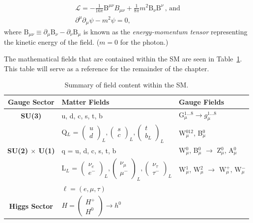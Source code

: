 \begin{equation}
\begin{array}{l}
\mathcal{L} = -\frac{1}{16\pi} \mathrm{B}^{\mu\nu}B_{\mu\nu} + \frac{1}{8\pi}m^{2}\mathrm{B}_{\nu}\mathrm{B}^{\nu}\,,\,\textrm{and}\\
\partial^{\mu} \partial_{\mu} \psi - m^{2} \psi = 0,
\end{array}
\end{equation}
where $\mathrm{B}_{\mu\nu} \equiv \partial_{\mu}\mathrm{B}_{\nu} - \partial_{\nu}\mathrm{B}_{\mu}$ is known as the \textit{energy-momentum tensor} representing the kinetic energy of the field. ($m=0$ for the photon.)

The mathematical fields that are contained within the SM are seen in Table~\ref{tab:sm}. This table will serve as a reference for the remainder of the chapter.

\begin{table}
\caption{Summary of field content within the SM.}
\centering
\begin{tabular}{c|ll}
\hline\hline
Gauge Sector & Matter Fields & Gauge Fields \\
\hline
\textbf{SU(3)} & u, d, c, s, t, b & G$_{\mu}^{1...8} \rightarrow g_{\mu}^{1...8} $ \\
\hline
 & Q$_{L}$ = $\begin{pmatrix} u \\ d \end{pmatrix}_{L}, \begin{pmatrix} s \\ c \end{pmatrix}_{L}, \begin{pmatrix} t \\ b_{L} \end{pmatrix}_{L} $ & W$^{012}_{\mu}$, B$^{0}_{\mu}$ \\
\textbf{SU(2) $\times$ U(1)} & q = u, d, c, s, t, b & W$_{\mu}^{0}$, B$_{\mu}^{0}$ $\rightarrow$ Z$^{0}_{\mu}$, A$^{0}_{\mu}$\\
  & L$_{L}$ = $\begin{pmatrix} \nu_{e} \\ e^{-} \end{pmatrix}_{L} , \begin{pmatrix} \nu_{\mu} \\ \mu^{-} \end{pmatrix}_{L} , \begin{pmatrix} \nu_{\tau} \\ \tau^{-}\end{pmatrix}_{L} $ & W$_{\mu}^{1}$, W$^{2}_{\mu}$ $\rightarrow$ W$_{\mu}^{+}$, W$_{\mu}^{-}$\\
  & $\ell = (e, \mu, \tau)$ & \\
  \hline
\textbf{Higgs Sector} & $H = \begin{pmatrix} H^{+} \\ H^{0} \end{pmatrix} \rightarrow h^{0}$ & \\
  \hline\hline
\end{tabular}
\label{tab:sm}
\end{table}

